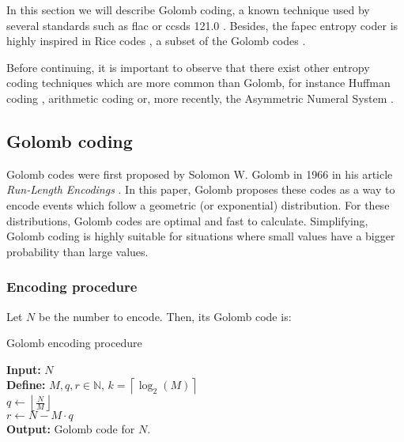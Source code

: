 In this section we will describe Golomb coding, a known technique used by several standards such as \acrshort{flac} \parencite{FLAC} or \acrshort{ccsds} 121.0 \parencite{ccsds121}. Besides, the \acrshort{fapec} entropy coder \parencite{PaperFAPEC} is highly inspired in Rice codes \parencite{RiceCodes}, a subset of the Golomb codes \parencite{Golomb1966}.

Before continuing, it is important to observe that there exist other entropy coding techniques which are more common than Golomb, for instance Huffman coding \parencite{cover}, arithmetic coding \parencite{MacKay} or, more recently, the Asymmetric Numeral System \parencite{ans}.

\subsection{Golomb coding} \label{golomb-coding}
Golomb codes were first proposed by Solomon W. Golomb in 1966 in his article \textit{Run-Length Encodings} \parencite{Golomb1966}. In this paper, Golomb proposes these codes as a way to encode events which follow a geometric (or exponential) distribution. For these distributions, Golomb codes are optimal \parencite{OptimalRice} \parencite{OptimalGeometric} and fast to calculate. Simplifying, Golomb coding is highly suitable for situations where small values have a bigger probability than large values.

\subsubsection{Encoding procedure}
Let $N$ be the number to encode. Then, its Golomb code is:

\begin{algorithm}[H]
	\caption{Golomb encoding procedure}
	\SetAlgoLined
	\textbf{Input:} $N$\\
	\textbf{Define:} $M,q,r \in \mathbb{N}$, \quad $k = \left\lceil \log_2(M) \right\rceil$\\
	$q \gets \left\lfloor \frac{N}{M} \right\rfloor$\\
	$r \gets N - M \cdot q$\\
	\textbf{Output:} Golomb code for $N$.
\end{algorithm}

